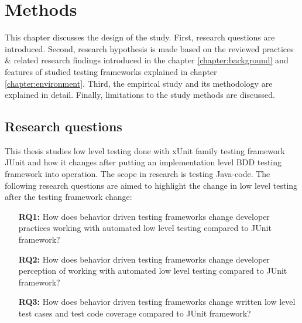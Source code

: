 \chapter{Methods}
\label{chapter:methods}
This chapter discusses the design of the study. First, research questions are introduced.
Second, research hypothesis is made based on the reviewed practices \& related research findings introduced in the chapter \ref{chapter:background}
and features of studied testing frameworks explained in chapter \ref{chapter:environment}.
Third, the empirical study and its methodology are explained in detail. Finally, limitations to the study methods are discussed.

\section{Research questions}
This thesis studies low level testing done with xUnit family testing framework JUnit and how it changes after putting
an implementation level BDD testing framework into operation. The scope in research is testing Java-code. The following
research questions are aimed to highlight the change in low level testing after the testing framework change:
\begin{addmargin}[2em]{0em}
\vspace{20px}
\begin{itemize}
\item[\textbf{RQ1:}] How does behavior driven testing frameworks change developer practices working with automated low level testing compared to JUnit framework?
\item[\textbf{RQ2:}] How does behavior driven testing frameworks change developer perception of working with automated low level testing compared to JUnit framework?
\item[\textbf{RQ3:}] How does behavior driven testing frameworks change written low level test cases and test code coverage compared to JUnit framework?
\end{itemize}
\end{addmargin}

